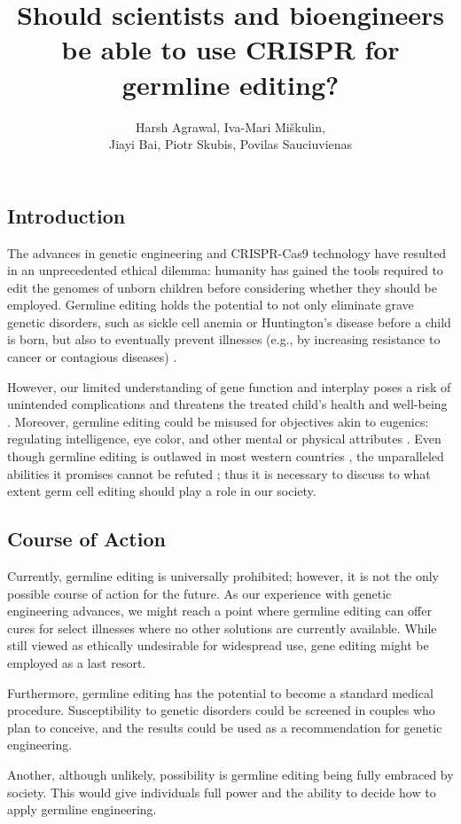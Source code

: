\documentclass[12pt]{article}
\title{Should scientists and bioengineers be able to use CRISPR for germline editing?}
\author{Harsh Agrawal, Iva-Mari Miškulin, \\ Jiayi Bai, Piotr Skubis, Povilas Sauciuvienas}
\date{}
\begin{document}
\maketitle
\subsection*{Introduction}
The advances in genetic engineering and CRISPR-Cas9 technology have resulted in
an unprecedented ethical dilemma: humanity has gained the tools required to
edit the genomes of unborn children before considering whether they should be
employed. Germline editing holds the potential to not only eliminate grave
genetic disorders, such as sickle cell anemia or Huntington's disease before a
child is born, but also to eventually prevent illnesses (e.g., by increasing
resistance to cancer or contagious diseases) \parencite{gyngell_2017}.

However, our limited understanding of gene function and interplay poses a risk
of unintended complications and threatens the treated child's health and
well-being \parencite{frosch_2022}. Moreover, germline editing could be misused
for objectives akin to eugenics: regulating intelligence, eye color, and other
mental or physical attributes \parencite{sufian_2021}. Even though germline
editing is outlawed in most western countries \parencite{araki_ishii_2014}, the
unparalleled abilities it promises cannot be refuted \parencite{gyngell_2017};
thus it is necessary to discuss to what extent germ cell editing should play a
role in our society.

\subsection*{Course of Action}
Currently, germline editing is universally prohibited; however, it is not the
only possible course of action for the future. As our experience with genetic
engineering advances, we might reach a point where germline editing can offer
cures for select illnesses where no other solutions are currently available.
While still viewed as ethically undesirable for widespread use, gene editing
might be employed as a last resort.

Furthermore, germline editing has the potential to become a standard medical
procedure. Susceptibility to genetic disorders could be screened in couples who
plan to conceive, and the results could be used as a recommendation for genetic
engineering.

Another, although unlikely, possibility is germline editing being fully
embraced by society. This would give individuals full power and the ability to
decide how to apply germline engineering.
\end{document}
